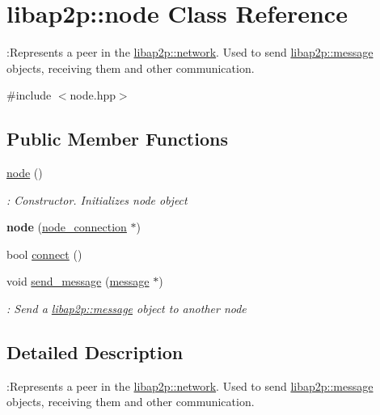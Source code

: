 \hypertarget{classlibap2p_1_1node}{\section{libap2p\-:\-:node Class Reference}
\label{classlibap2p_1_1node}
}


\-:Represents a peer in the \hyperlink{classlibap2p_1_1network}{libap2p\-::network}. Used to send \hyperlink{classlibap2p_1_1message}{libap2p\-::message} objects, receiving them and other communication.  




{\ttfamily \#include $<$node.\-hpp$>$}

\subsection*{Public Member Functions}
\begin{DoxyCompactItemize}
\item 
\hypertarget{classlibap2p_1_1node_ae75928811247397aa11c692ead20e6ec}{\hyperlink{classlibap2p_1_1node_ae75928811247397aa11c692ead20e6ec}{node} ()}\label{classlibap2p_1_1node_ae75928811247397aa11c692ead20e6ec}

\begin{DoxyCompactList}\small\item\em \-: Constructor. Initializes node object \end{DoxyCompactList}\item 
\hypertarget{classlibap2p_1_1node_abc5bc4f3e11a2110156cdbcf21f92355}{{\bfseries node} (\hyperlink{classlibap2p_1_1node__connection}{node\-\_\-connection} $\ast$)}\label{classlibap2p_1_1node_abc5bc4f3e11a2110156cdbcf21f92355}

\item 
bool \hyperlink{classlibap2p_1_1node_acaab6b50b4a46a99b53c5e4bb2e78760}{connect} ()
\item 
void \hyperlink{classlibap2p_1_1node_a8601f7559082dc14f395b6cb6bbb5f0e}{send\-\_\-message} (\hyperlink{classlibap2p_1_1message}{message} $\ast$)
\begin{DoxyCompactList}\small\item\em \-: Send a \hyperlink{classlibap2p_1_1message}{libap2p\-::message} object to another node \end{DoxyCompactList}\end{DoxyCompactItemize}


\subsection{Detailed Description}
\-:Represents a peer in the \hyperlink{classlibap2p_1_1network}{libap2p\-::network}. Used to send \hyperlink{classlibap2p_1_1message}{libap2p\-::message} objects, receiving them and other communication. 

